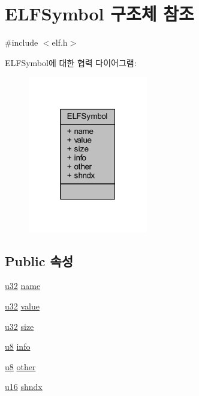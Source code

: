 \hypertarget{struct_e_l_f_symbol}{}\section{E\+L\+F\+Symbol 구조체 참조}
\label{struct_e_l_f_symbol}


{\ttfamily \#include $<$elf.\+h$>$}



E\+L\+F\+Symbol에 대한 협력 다이어그램\+:\nopagebreak
\begin{figure}[H]
\begin{center}
\leavevmode
\includegraphics[width=148pt]{struct_e_l_f_symbol__coll__graph}
\end{center}
\end{figure}
\subsection*{Public 속성}
\begin{DoxyCompactItemize}
\item 
\mbox{\hyperlink{_system_8h_a10e94b422ef0c20dcdec20d31a1f5049}{u32}} \mbox{\hyperlink{struct_e_l_f_symbol_a976a529631ba267687dbd10db51c7d7f}{name}}
\item 
\mbox{\hyperlink{_system_8h_a10e94b422ef0c20dcdec20d31a1f5049}{u32}} \mbox{\hyperlink{struct_e_l_f_symbol_ab2da134d25fef0ac7b83c49a5d0ada6c}{value}}
\item 
\mbox{\hyperlink{_system_8h_a10e94b422ef0c20dcdec20d31a1f5049}{u32}} \mbox{\hyperlink{struct_e_l_f_symbol_a40bb6453d115f04dc63227dd6da7611f}{size}}
\item 
\mbox{\hyperlink{_system_8h_aed742c436da53c1080638ce6ef7d13de}{u8}} \mbox{\hyperlink{struct_e_l_f_symbol_a9cde1ecfa1e072a05540d6ffbb325335}{info}}
\item 
\mbox{\hyperlink{_system_8h_aed742c436da53c1080638ce6ef7d13de}{u8}} \mbox{\hyperlink{struct_e_l_f_symbol_a2ef76e3d315db14d758abd8e30235f8a}{other}}
\item 
\mbox{\hyperlink{_system_8h_a9e6c91d77e24643b888dbd1a1a590054}{u16}} \mbox{\hyperlink{struct_e_l_f_symbol_a66f166eed1f7e96da9bfdc8cee7d887d}{shndx}}
\end{DoxyCompactItemize}


